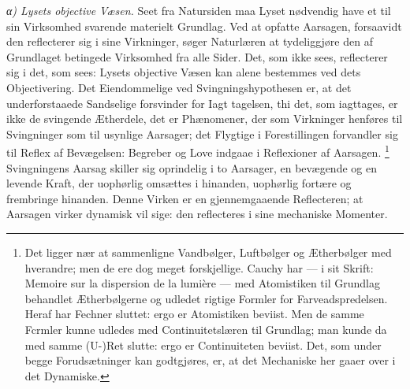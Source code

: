 \documentclass[12pt,a4paper]{book}
\newcommand{\subrunin}[1]{\emph{#1}\hspace{0.4em}}
\begin{document}
\subrunin{α) Lysets objective Væsen.} Seet fra Natursiden maa Lyset
nødvendig have et til sin Virksomhed svarende materielt Grundlag. Ved
at opfatte Aarsagen, forsaavidt den reflecterer sig i sine Virkninger,
søger Naturlæren at tydeliggjøre den af Grundlaget betingede
Virksomhed fra alle Sider. Det, som ikke sees, reflecterer sig i det,
som sees: Lysets objective Væsen kan alene bestemmes ved dets
Objectivering. Det Eiendommelige ved Svingningshypothesen
er, at det underforstaaede Sandselige forsvinder for Iagt\-%
tagelsen, thi det, som iagttages, er ikke de svingende Ætherdele, det
er Phænomener, der som Virkninger henføres til Svingninger som til
usynlige Aarsager; det Flygtige i Forestillingen forvandler sig til
Reflex af Bevægelsen: Begreber og Love indgaae i Reflexioner af
Aarsagen.%
\footnote{%
Det ligger nær at sammenligne Vandbølger, Luftbølger og Ætherbølger med
hverandre; men de ere dog meget forskjellige. Cauchy har --- i sit
Skrift: Memoire sur la dispersion de la lumière --- med Atomistiken til
Grundlag behandlet Ætherbølgerne og udledet rigtige Formler for
Farveadspredelsen. Heraf har Fechner sluttet: ergo er Atomistiken
beviist. Men de samme Fcrmler kunne udledes med Continuitetslæren til
Grundlag; man kunde da med samme (U-)Ret slutte: ergo er Continuiteten
beviist. Det, som under begge Forudsætninger kan godtgjøres, er, at det
Mechaniske her gaaer over i det Dynamiske.
}
Svingningens Aarsag skiller sig oprindelig i to Aarsager, en bevægende
og en levende Kraft, der uophørlig omsættes i hinanden, uophørlig
fortære og frembringe hinanden. Denne Virken er en gjennemgaaende
Reflecteren; at Aarsagen virker dynamisk vil sige: den reflecteres i
sine mechaniske Momenter.%
\end{document}
